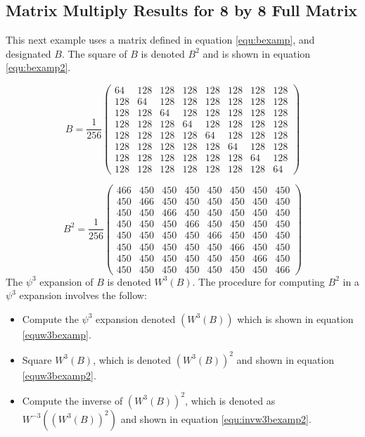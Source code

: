 \subsection{Matrix Multiply Results for 8 by 8 Full Matrix}\label{sec:fullmatrix}
This next example uses a matrix defined in equation \ref{equ:bexamp}, and designated $B$.  %
The square of $B$ is denoted $B^2$ and is shown in equation \ref{equ:bexamp2}.  

\begin{equation}
\label{equ:bexamp}
B = \frac{1}{256} \left(
\begin{array}{cccccccc}
64 & 128 & 128 & 128 & 128 & 128 & 128 & 128 \\ 
128 & 64 & 128 & 128 & 128 & 128 & 128 & 128 \\ 
128 & 128 & 64 & 128 & 128 & 128 & 128 & 128 \\ 
128 & 128 & 128 & 64 & 128 & 128 & 128 & 128 \\ 
128 & 128 & 128 & 128 & 64 & 128 & 128 & 128 \\ 
128 & 128 & 128 & 128 & 128 & 64 & 128 & 128 \\ 
128 & 128 & 128 & 128 & 128 & 128 & 64 & 128 \\ 
128 & 128 & 128 & 128 & 128 & 128 & 128 & 64
\end{array} \right)
\end{equation}

\begin{equation}
\label{equ:bexamp2}
B^2 = \frac{1}{256}  \left(
\begin{array}{cccccccc}
466 & 450 & 450 & 450 & 450 & 450 & 450 & 450\\
450 & 466 & 450 & 450 & 450 & 450 & 450 & 450\\
450 & 450 & 466 & 450 & 450 & 450 & 450 & 450\\
450 & 450 & 450 & 466 & 450 & 450 & 450 & 450\\
450 & 450 & 450 & 450 & 466 & 450 & 450 & 450\\
450 & 450 & 450 & 450 & 450 & 466 & 450 & 450\\
450 & 450 & 450 & 450 & 450 & 450 & 466 & 450\\
450 & 450 & 450 & 450 & 450 & 450 & 450 & 466
\end{array} \right)
\end{equation}
The $\psi^3$ expansion of $B$ is denoted $W^3(B)$.  The procedure for computing $B^2$ in a $\psi^3$ expansion involves the follow:
\begin{itemize}
\item Compute the $\psi^3$ expansion denoted $(W^3(B))$ which is shown in equation \ref{equw3bexamp}.
\item Square $W^3(B)$, which is denoted $(W^3(B))^2$ and shown in equation \ref{equw3bexamp2}.
\item Compute the inverse of $(W^3(B))^2$, which is denoted as $W^{-3}((W^3(B))^2)$ and shown in equation \ref{equ:invw3bexamp2}.
\end{itemize}

